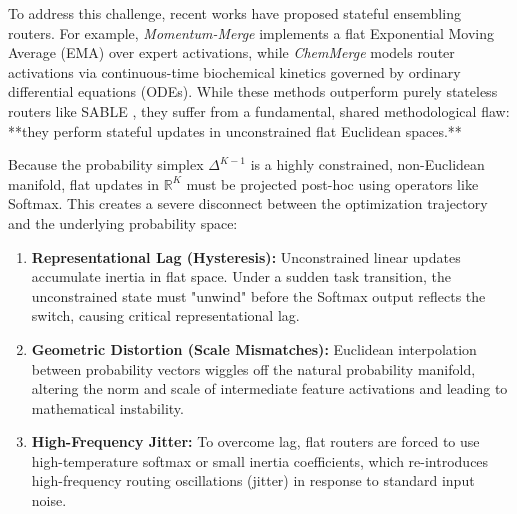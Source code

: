To address this challenge, recent works have proposed stateful ensembling routers. For example, \emph{Momentum-Merge} implements a flat Exponential Moving Average (EMA) over expert activations, while \emph{ChemMerge} models router activations via continuous-time biochemical kinetics governed by ordinary differential equations (ODEs). While these methods outperform purely stateless routers like SABLE \cite{wang2020tent, liao2021are}, they suffer from a fundamental, shared methodological flaw: **they perform stateful updates in unconstrained flat Euclidean spaces.** 

Because the probability simplex $\Delta^{K-1}$ is a highly constrained, non-Euclidean manifold, flat updates in $\mathbb{R}^K$ must be projected post-hoc using operators like Softmax. This creates a severe disconnect between the optimization trajectory and the underlying probability space:
\begin{enumerate}
    \item \textbf{Representational Lag (Hysteresis):} Unconstrained linear updates accumulate inertia in flat space. Under a sudden task transition, the unconstrained state must "unwind" before the Softmax output reflects the switch, causing critical representational lag.
    \item \textbf{Geometric Distortion (Scale Mismatches):} Euclidean interpolation between probability vectors wiggles off the natural probability manifold, altering the norm and scale of intermediate feature activations and leading to mathematical instability.
    \item \textbf{High-Frequency Jitter:} To overcome lag, flat routers are forced to use high-temperature softmax or small inertia coefficients, which re-introduces high-frequency routing oscillations (jitter) in response to standard input noise.
\end{enumerate}

